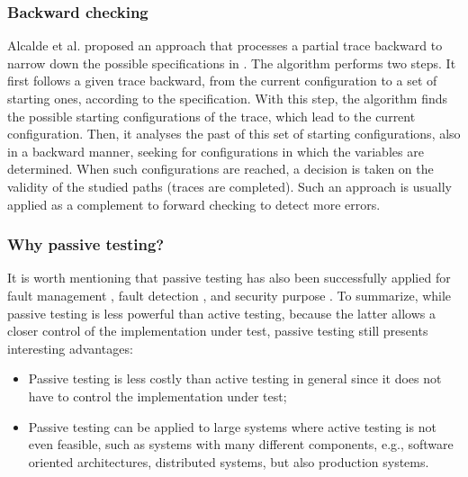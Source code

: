 \subsubsection{Backward checking}

Alcalde et al. proposed an approach that processes a partial
trace backward to narrow down the possible specifications in
\cite{alcalde2004network}. The algorithm performs two steps. It
first follows a given trace backward, from the current
configuration to a set of starting ones, according to the
specification. With this step, the algorithm finds the possible
starting configurations of the trace, which lead to the current
configuration. Then, it analyses the past of this set of starting
configurations, also in a backward manner, seeking for
configurations in which the variables are determined.  When such
configurations are reached, a decision is taken on the validity
of the studied paths (traces are completed). Such an approach is
usually applied as a complement to forward checking to detect
more errors.

\subsubsection{Why passive testing?}

It is worth mentioning that passive testing has also been
successfully applied for fault management \cite{965909}, fault
detection \cite{Ural:2007:IAP:1270230.1270259}, and security
purpose \cite{4698175}. To summarize, while passive testing is
less powerful than active testing, because the latter allows a
closer control of the implementation under test, passive testing
still presents interesting advantages:

\begin{itemize}
    \item Passive testing is less costly than active testing in
        general since it does not have to control the
        implementation under test;

    \item Passive testing can be applied to large systems where
        active testing is not even feasible, such as systems with
        many different components, e.g., software oriented
        architectures, distributed systems, but also production
        systems.
\end{itemize}
